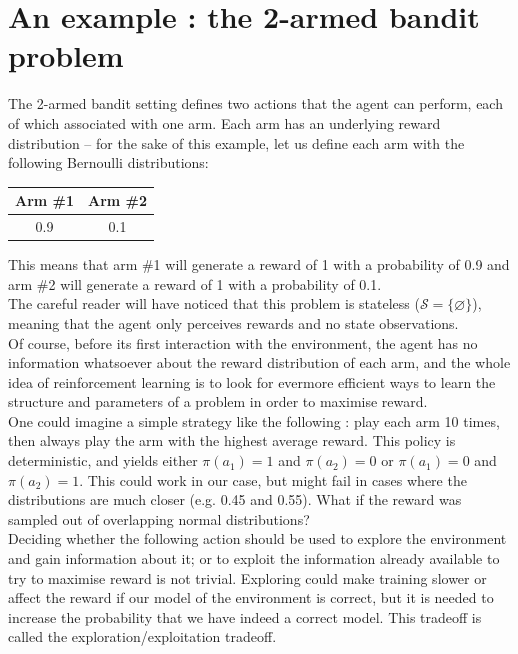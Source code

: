 \section{An example : the 2-armed bandit problem}
\label{sec:rl_example}
The 2-armed bandit setting defines two actions that the agent can perform,
each of which associated with one arm. Each arm has an underlying reward
distribution -- for the sake of this example, let us define each arm with the
following Bernoulli distributions: 

\begin{table}[H]
	\centering
	\begin{tabular}{c|c}
		Arm \#1 & Arm \#2 \\ \hline
		0.9 & 0.1
	\end{tabular}
\end{table}

\noindent This means that arm \#1 will generate a reward of 1 with a probability
of 0.9 and arm \#2 will generate a reward of 1 with a probability of 0.1.\\

The careful reader will have noticed that this problem is stateless 
($\mathcal{S} = \{\varnothing\}$), meaning that the agent only perceives
rewards and no state observations.\\

Of course, before its first interaction with the environment, the agent has no
information whatsoever about the reward distribution of each arm, and the whole
idea of reinforcement learning is to look for evermore efficient ways to learn
the structure and parameters of a problem in order to maximise reward.\\

One could imagine a simple strategy like the following : play each arm 10 times,
then always play the arm with the highest average reward. This policy is
deterministic, and yields either $ \pi(a_1) = 1$ and $\pi(a_2) = 0$ or
$\pi(a_1) = 0$ and $\pi(a_2) = 1$. This could work in
our case, but might fail in cases where the distributions are much closer
(e.g. 0.45 and 0.55). What if the reward was sampled out of overlapping normal
distributions?\\

Deciding whether the following action should be used to explore the environment
and gain information about it; or to exploit the information already available
to try to maximise reward is not trivial. Exploring could make training slower
or affect the reward if our model of the environment is correct, but it is 
needed to increase the probability that we have indeed a correct model. This
tradeoff is called the exploration/exploitation tradeoff. 
\\


